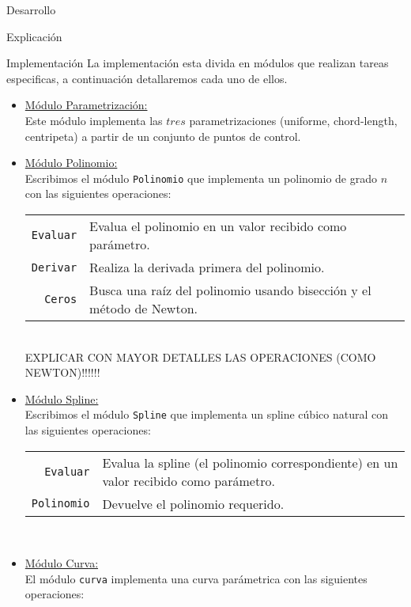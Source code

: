\begin{section}{Desarrollo}
	\begin{subsection}{Explicación}
		
	\end{subsection}
	\begin{subsection}{Implementación}
		La implementación esta divida en módulos que realizan tareas especificas, a continuación detallaremos cada uno de ellos.
		
		\begin{itemize}
			\item \underline{Módulo Parametrización:}\\
				Este módulo implementa las $tres$ parametrizaciones (uniforme, chord-length, centripeta) a partir de un conjunto de puntos de control.
			\item \underline{Módulo Polinomio:}\\
				Escribimos el módulo \texttt{Polinomio} que implementa un polinomio de grado $n$ con las siguientes operaciones:\\
				
				\begin{tabular}{rl}
					\texttt{Evaluar} & Evalua el polinomio en un valor recibido como parámetro.\\
					\texttt{Derivar} & Realiza la derivada primera del polinomio.\\
					\texttt{Ceros}   & Busca una raíz del polinomio usando bisección y el método de Newton.\\
				\end{tabular}\\
				EXPLICAR CON MAYOR DETALLES LAS OPERACIONES (COMO NEWTON)!!!!!!
		
			\item \underline{Módulo Spline:}\\
				Escribimos el módulo \texttt{Spline} que implementa un spline cúbico natural con las siguientes operaciones:\\
				
				\begin{tabular}{rl}
					\texttt{Evaluar} & Evalua la spline (el polinomio correspondiente) en un valor recibido como parámetro.\\
					\texttt{Polinomio} & Devuelve el polinomio requerido.\\
				\end{tabular}\\

			\item \underline{Módulo Curva:}\\
				El módulo \texttt{curva} implementa una curva parámetrica con las siguientes operaciones:\\
				

\end{itemize}
\end{subsection}
\end{section}

